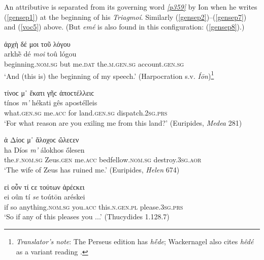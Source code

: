An attributive  is separated from its governing word \hyperlink{p359}{\emph{[p359]}} by Ion when he writes (\ref{gensep1}) at the beginning of his \textit{Triagmoí}. Similarly (\ref{gensep2})--(\ref{gensep7}) and (\ref{voc5}) above. (But \textit{emé} is also found in this configuration: (\ref{gensep8}).)

\begin{exe}
\ex ἀρχὴ δέ μοι τοῦ λόγου\\
\gll arkhḕ dé \emph{moi} toû lógou\\
beginning.\textsc{nom.sg} but me.\textsc{dat} the.\textsc{m.gen.sg}
account.\textsc{gen.sg}\\
\trans `And (this is) the beginning of my speech.' (Harpocration s.v. \textit{Íōn})\footnote{\emph{Translator's note}: The Perseus edition has \textit{hḗde}; Wackernagel also
cites \textit{hêdé} as a variant reading \citep[385]{Lobeck1829}.}
\label{gensep1}
\end{exe}

\begin{exe}
\ex τίνοϲ μ᾽ ἕκατι γῆϲ ἀποϲτέλλειϲ\\
\gll tínos \emph{m'} hékati gês apostélleis\\
what.\textsc{gen.sg} me.\textsc{acc} for land.\textsc{gen.sg}
dispatch.\textsc{2sg.prs}\\
\trans `For what reason are you exiling me from this land?' (Euripides, \textit{Medea} 281)
\label{gensep2}
\end{exe}

\begin{exe}
\ex ἁ Δίοϲ μ᾽ ἄλοχοϲ ὤλεϲεν\\
\gll ha Díos \emph{m'} álokhos ṓlesen\\
the.\textsc{f.nom.sg} Zeus.\textsc{gen} me.\textsc{acc} bedfellow.\textsc{nom.sg} destroy.\textsc{3sg.aor}\\
\trans `The wife of Zeus has ruined me.' (Euripides, \textit{Helen} 674)
\label{gensep3}
\end{exe}

\begin{exe}
\ex εἰ οὖν τί ϲε τούτων ἀρέϲκει\\
\gll ei oûn tí \emph{se} toútōn aréskei\\
if so anything.\textsc{nom.sg} you.\textsc{acc} this.\textsc{n.gen.pl}
please.\textsc{3sg.prs}\\
\trans `So if any of this pleases you ...' (Thucydides 1.128.7)
\label{gensep5}
\end{exe}

